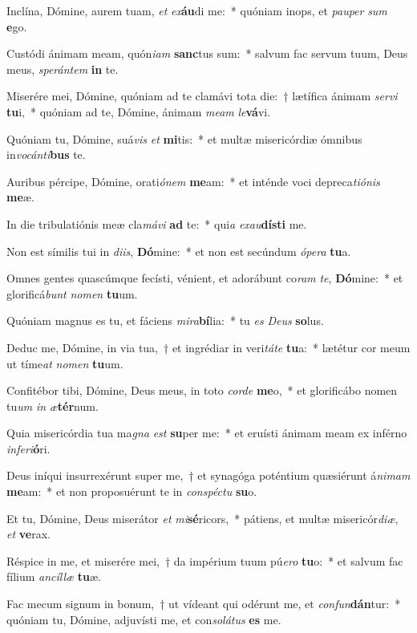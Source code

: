 \item Inclína, Dómine, aurem tuam, \textit{et} \textit{ex}\textbf{áu}di me:~* quóniam inops, et \textit{pau}\textit{per} \textit{sum} \textbf{e}go.
\item Custódi ánimam meam, quón\textit{i}\textit{am} \textbf{sanc}tus sum:~* salvum fac servum tuum, Deus meus, \textit{spe}\textit{rán}\textit{tem} \textbf{in} te.
\item Miserére mei, Dómine, quóniam ad te clamávi tota die:~† lætífica ánimam \textit{ser}\textit{vi} \textbf{tu}i,~* quóniam ad te, Dómine, ánimam \textit{me}\textit{am} \textit{le}\textbf{vá}vi.
\item Quóniam tu, Dómine, suá\textit{vis} \textit{et} \textbf{mi}tis:~* et multæ misericórdiæ ómnibus in\textit{vo}\textit{cán}\textit{ti}\textbf{bus} te.
\item Auribus pércipe, Dómine, orati\textit{ó}\textit{nem} \textbf{me}am:~* et inténde voci depreca\textit{ti}\textit{ó}\textit{nis} \textbf{me}æ.
\item In die tribulatiónis meæ cla\textit{má}\textit{vi} \textbf{ad} te:~* qui\textit{a} \textit{ex}\textit{au}\textbf{dís}\textbf{ti} me.
\item Non est símilis tui in \textit{di}\textit{is}, \textbf{Dó}mine:~* et non est secúndum \textit{ó}\textit{pe}\textit{ra} \textbf{tu}a.
\item Omnes gentes quascúmque fecísti, vénient, et adorábunt co\textit{ram} \textit{te}, \textbf{Dó}mine:~* et glorificá\textit{bunt} \textit{no}\textit{men} \textbf{tu}um.
\item Quóniam magnus es tu, et fáciens \textit{mi}\textit{ra}\textbf{bí}lia:~* tu \textit{es} \textit{De}\textit{us} \textbf{so}lus.
\item Deduc me, Dómine, in via tua,~† et ingrédiar in veri\textit{tá}\textit{te} \textbf{tu}a:~* lætétur cor meum ut tíme\textit{at} \textit{no}\textit{men} \textbf{tu}um.
\item Confitébor tibi, Dómine, Deus meus, in toto \textit{cor}\textit{de} \textbf{me}o,~* et glorificábo nomen tu\textit{um} \textit{in} \textit{æ}\textbf{tér}num.
\item Quia misericórdia tua ma\textit{gna} \textit{est} \textbf{su}per me:~* et eruísti ánimam meam ex inférno \textit{in}\textit{fe}\textit{ri}\textbf{ó}ri.
\item Deus iníqui insurrexérunt super me,~† et synagóga poténtium quæsiérunt á\textit{ni}\textit{mam} \textbf{me}am:~* et non proposuérunt te in \textit{con}\textit{spéc}\textit{tu} \textbf{su}o.
\item Et tu, Dómine, Deus miserátor \textit{et} \textit{mi}\textbf{sé}ricors,~* pátiens, et multæ misericór\textit{di}\textit{æ}, \textit{et} \textbf{ve}rax.
\item Réspice in me, et miserére mei,~† da impérium tuum pú\textit{e}\textit{ro} \textbf{tu}o:~* et salvum fac fílium \textit{an}\textit{cíl}\textit{læ} \textbf{tu}æ.
\item Fac mecum signum in bonum,~† ut vídeant qui odérunt me, et \textit{con}\textit{fun}\textbf{dán}tur:~* quóniam tu, Dómine, adjuvísti me, et con\textit{so}\textit{lá}\textit{tus} \textbf{es} me.
